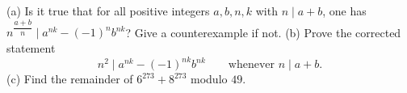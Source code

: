 (a) Is it true that for all positive integers $a,b,n,k$ with $n\mid a+b$, one has $n^{\dfrac{a+b}{n}}\mid a^{nk}-(-1)^n b^{nk}$? Give a counterexample if not.
(b) Prove the corrected statement
\[
n^2\mid a^{nk}-(-1)^{nk}b^{nk}\qquad\text{whenever }n\mid a+b.
\]
(c) Find the remainder of $6^{273}+8^{273}$ modulo $49$.

